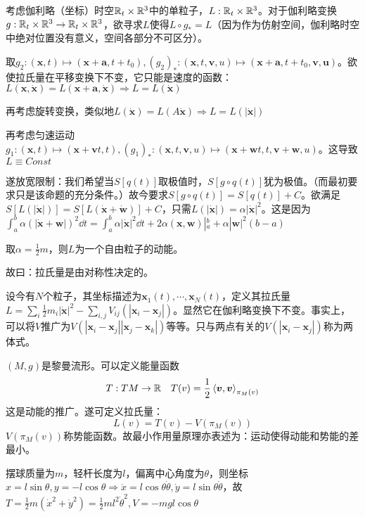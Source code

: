 \documentclass{ctexbook}
\begin{document}
\begin{Eg}[伽利略时空的单粒子]
  考虑伽利略（坐标）时空$\mathbb{R}_{t}\times \mathbb{R}^{3}$中的单粒子，$L:\mathbb{R}_{t}\times \mathbb{R}^{3}$。对于伽利略变换$g:\mathbb{R}_{t}\times \mathbb{R}^{3}\to\mathbb{R}_{t}\times\mathbb{R}^{3}$，欲寻求$L$使得$L\circ g_{*}=L$（因为作为仿射空间，伽利略时空中绝对位置没有意义，空间各部分不可区分）。

  取$g_{2}:(\bm x,t)\mapsto (\bm x+\bm a,t+t_{0}), (g_{2})_{*}:(\bm x,t,\bm v,u)\mapsto (\bm x+\bm a, t+t_{0},\bm v,\bm u)$。欲使拉氏量在平移变换下不变，它只能是速度的函数：$L(\bm x,\dot{\bm x})=L(\bm x+\bm a,\dot{\bm x})\Rightarrow L=L(\dot{\bm x})$

  再考虑旋转变换，类似地$L(\dot{\bm x})=L(A\dot{\bm x})\Rightarrow L=L(|\dot{\bm x}|)$

  再考虑匀速运动$g_{1}:(\bm x,t)\mapsto(\bm x+\bm v t,t),(g_{1})_{*}:(\bm x,t,\bm v,u)\mapsto (\bm x+\bm wt,t,\bm v+\bm w,u)$。这导致$L\equiv Const$

  遂放宽限制：我们希望当$S[q(t)]$取极值时，$S[g\circ q(t)]$犹为极值。（而最初要求只是该命题的充分条件。）故今要求$S[g\circ q(t)]=S[q(t)]+C$。欲满足$S[L(|\dot{\bm x}|)]=S[L(\dot{\bm x}+\dot{\bm w})]+C$，只需$L(|\dot{\bm x}|)=\alpha|\dot{\bm x}|^{2}$。这是因为$\int_{a}^{b}\alpha(|\dot{\bm x}+{\bm w}|)^{2}\dd t=\int_{a}^{b}\alpha|\dot{\bm x}|^{2}\dd t+2\alpha(\bm x,\bm w)|_{a}^{b}+\alpha|\bm w|^{2}(b-a)$

  取$\alpha=\frac{1}{2}m$，则$L$为一个自由粒子的动能。
\end{Eg}

故曰：拉氏量是由对称性决定的。

\begin{Eg}[伽利略时空的多粒子]
  设今有$N$个粒子，其坐标描述为$\bm x_{1}(t),\cdots,\bm x_{N}(t) $，定义其拉氏量$L=\sum_{i}\frac{1}{2}m_{i}|\dot{\bm x}|^{2}-\sum_{i,j}V_{ij}(|\bm x_{i}-\bm x_{j}|)$。显然它在伽利略变换下不变。事实上，可以将$V$推广为$V(|\bm x_{i}-\bm x_{j}||\bm x_{j}-\bm x_{k}|)$等等。只与两点有关的$V(|\bm x_{i}-\bm x_{j}|)$称为两体式。
\end{Eg}

\begin{Eg}[自然系统]
  $(M,g)$是黎曼流形。可以定义能量函数
  \[T:TM\to\mathbb{R}\quad T(v)=\frac{1}{2}\left<\bm v,\bm v\right>_{\pi_{M}(v)}\]
  这是动能的推广。遂可定义拉氏量：
  \[L(v)=T(v)-V(\pi_{M}(v))\]
  $V(\pi_{M}(v))$称势能函数。故最小作用量原理亦表述为：运动使得动能和势能的差最小。
\end{Eg}

\begin{Eg}[单摆]
  摆球质量为$m$，轻杆长度为$l$，偏离中心角度为$\theta$，则坐标$x=l\sin\theta,y=-l\cos\theta\Rightarrow \dot x=l\cos\theta\dot\theta,\dot y=l\sin\theta\dot\theta$，故$T=\frac{1}{2}m({\dot{x}}^{2}+\dot{y}^{2})=\frac{1}{2}ml^{2}\dot{\theta}^{2},V=-mgl\cos\theta$
\end{Eg}
\end{document}
